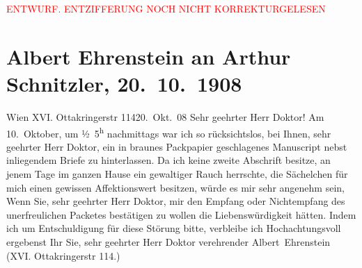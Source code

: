 
\begin{center}
            \textcolor{red}{ENTWURF. ENTZIFFERUNG NOCH NICHT KORREKTURGELESEN}
                      \end{center}
            
               \section[Albert Ehrenstein an Arthur Schnitzler, 20. 10. 1908]{ Albert Ehrenstein an Arthur Schnitzler, 20. 10. 1908}\nopagebreak{}\rehead{ }\begin{ledgroupsized}[t]{13cm}\normalsize\beginnumbering{} \toendnotes[C]{\smallbreak\pagebreak[2]} 
\toendnotes[C]{\smallbreak}\pstart
           {\pb}Wien XVI. Ottakringerstr 114\hfill 20. Okt. 08\pend
           \pstart{}Sehr geehrter Herr Doktor! \pend\pstart
           Am 10. Oktober, um ½ 5\textsuperscript{h} nachmittags war ich so rücksichtslos, bei Ihnen, sehr geehrter Herr
                    Doktor, ein in braunes Packpapier geschlagenes Manuscript nebst inliegendem Briefe zu
                    hinterlassen. Da ich keine zweite Abschrift besitze, an jenem Tage im ganzen
                    Hause ein gewaltiger Rauch herrschte, die Sächelchen für mich einen gewissen
                    Affektionswert besitzen, würde es mir sehr angenehm sein, Wenn
                    Sie, sehr geehrter Herr Doktor, {\pb}mir den Empfang oder Nichtempfang
                    des unerfreulichen Packetes bestätigen zu wollen die Liebenswürdigkeit hätten.
                    Indem ich um Entschuldigung für diese Störung bitte, verbleibe ich
                    Hochachtungsvoll ergebenst Ihr Sie, sehr geehrter Herr Doktor verehrender\pend
           \pstart \spacefill\mbox{Albert Ehrenstein}\pend{}\pstart
           \noindent{}(XVI. Ottakringerstr 114.)\pend
           \endnumbering{}\end{ledgroupsized}  \newcommand{\dateiname}{L01793}\newcommand{\titel}{Albert Ehrenstein an Arthur Schnitzler, 20. 10. 1908}\newcommand{\editorInnen}{Martin Anton Müller und Gerd-Hermann Susen}
      